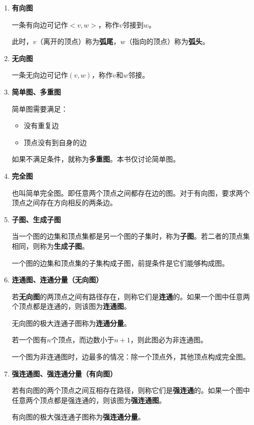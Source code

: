 \documentclass[12pt, a4paper, oneside]{ctexart}
\begin{document}
\begin{enumerate}
  \item {\bf 有向图}
  
  一条有向边可记作$<v,w>$，称作$v$邻接到$w$。

  此时，$v$（离开的顶点）称为\textbf{弧尾}，$w$（指向的顶点）称为\textbf{弧头}。

  \item {\bf 无向图}
  
  一条无向边可记作$(v,w)$，称作$v$和$w$邻接。

  \item {\bf 简单图、多重图}
  
  简单图需要满足：
  \begin{itemize}
  \item 没有重复边
  \item 顶点没有到自身的边
  \end{itemize}

  如果不满足条件，就称为\textbf{多重图}。本书仅讨论简单图。  

  \item {\bf 完全图}
  
  也叫简单完全图。即任意两个顶点之间都存在边的图。对于有向图，要求两个顶点之间存在方向相反的两条边。

  \item {\bf 子图、生成子图}
  
  当一个图的边集和顶点集都是另一个图的子集时，称为\textbf{子图}。若二者的顶点集相同，则称为\textbf{生成子图}。

  一个图的边集和顶点集的子集构成子图，前提条件是它们能够构成图。

  \item {\bf 连通图、连通分量（无向图）}
  
  若\textbf{无向图}的两顶点之间有路径存在，则称它们是\textbf{连通}的。如果一个图中任意两个顶点都是连通的，则该图为\textbf{连通图}。

  无向图的极大连通子图称为\textbf{连通分量}。

  若一个图有$n$个顶点，而边数小于$n+1$，则此图必为非连通图。

  一个图为非连通图时，边最多的情况：除一个顶点外，其他顶点构成完全图。

  \item {\bf 强连通图、强连通分量（有向图）}
  
  若有向图的两个顶点之间互相存在路径，则称它们是\textbf{强连通}的。如果一个图中任意两个顶点都是强连通的，则该图为\textbf{强连通图}。

  有向图的极大强连通子图称为\textbf{强连通分量}。


\end{enumerate}
\end{document}
